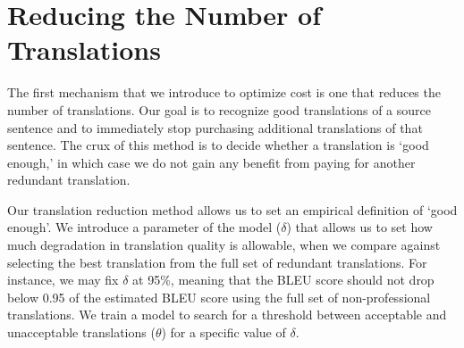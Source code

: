 \documentclass[11pt,letterpaper]{article}
\begin{document}
\section{Reducing the Number of Translations}
The first mechanism that we introduce to optimize cost is one that reduces the number of translations.  Our goal is to recognize good translations of a source sentence and to immediately stop purchasing additional  translations of that sentence.  The crux of this method is to decide whether a translation  is `good enough,' in which case we do not gain any benefit from  paying for another redundant translation.  

Our translation reduction method allows us to set an empirical definition of `good enough'.  We introduce a parameter  of the model  ($\delta$) that allows us to set how much degradation in translation quality is allowable, when we compare against selecting the best translation from the full set of redundant translations.  For instance, we may fix $\delta$ at 95\%, meaning that the BLEU score should not drop below 0.95 of the estimated BLEU score using the full set of non-professional translations.   We train a model to search for a threshold between acceptable and unacceptable translations ($\theta$) for a specific value of $\delta$. 
\end{document}
